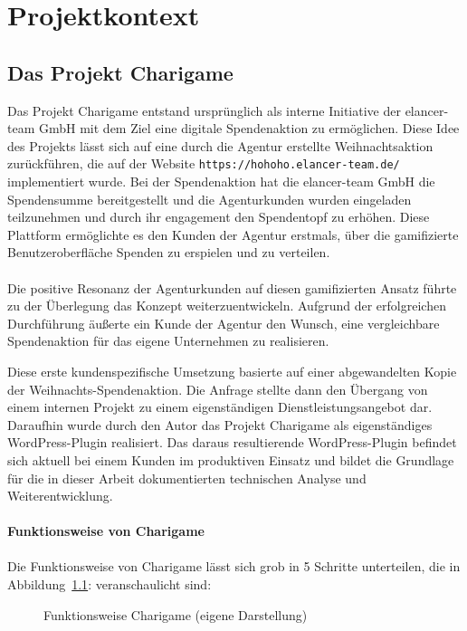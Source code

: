 \chapter{Projektkontext}

\section{Das Projekt Charigame}

Das Projekt Charigame entstand ursprünglich als interne Initiative der elancer-team GmbH mit dem Ziel eine digitale Spendenaktion zu ermöglichen.
Diese Idee des Projekts lässt sich auf eine durch die Agentur erstellte Weihnachtsaktion zurückführen, die auf der Website \texttt{https://hohoho.elancer-team.de/} implementiert wurde.
Bei der Spendenaktion hat die elancer-team GmbH die Spendensumme bereitgestellt und die Agenturkunden wurden eingeladen teilzunehmen und durch ihr engagement den Spendentopf zu erhöhen.
Diese Plattform ermöglichte es den Kunden der Agentur erstmals, über die gamifizierte Benutzeroberfläche Spenden zu erspielen und zu verteilen.
\\\\
Die positive Resonanz der Agenturkunden auf diesen gamifizierten Ansatz führte zu der Überlegung das Konzept weiterzuentwickeln.
Aufgrund der erfolgreichen Durchführung äußerte ein Kunde der Agentur den Wunsch, eine vergleichbare Spendenaktion für das eigene Unternehmen zu realisieren.

Diese erste kundenspezifische Umsetzung basierte auf einer abgewandelten Kopie der Weihnachts-Spendenaktion.
Die Anfrage stellte dann den Übergang von einem internen Projekt zu einem eigenständigen Dienstleistungsangebot dar.
Daraufhin wurde durch den Autor das Projekt Charigame als eigenständiges WordPress-Plugin realisiert.
Das daraus resultierende WordPress-Plugin befindet sich aktuell bei einem Kunden im produktiven Einsatz und bildet die Grundlage für die in dieser Arbeit dokumentierten technischen Analyse und Weiterentwicklung.
\\\\
\textbf{Funktionsweise von Charigame}
\\\\
Die Funktionsweise von Charigame lässt sich grob in 5 Schritte unterteilen, die in Abbildung~\ref{fig:charigame-funktion}: veranschaulicht sind:

\begin{figure}[tbh]
    \centering
    
    \caption{Funktionsweise Charigame (eigene Darstellung)}
    \label{fig:charigame-funktion}
\end{figure}
\newpage

